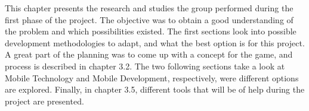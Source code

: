 This chapter presents the research and studies the group performed during the first phase of the project. The objective was to obtain a good understanding of the problem and which possibilities existed. The first sections look into possible development methodologies to adapt, and what the best option is for this project. A great part of the planning was to come up with a concept for the game, and process is described in chapter 3.2. The two following sections take a look at Mobile Technology and Mobile Development, respectively, were different options are explored. Finally, in chapter 3.5, different tools that will be of help during the project are presented.